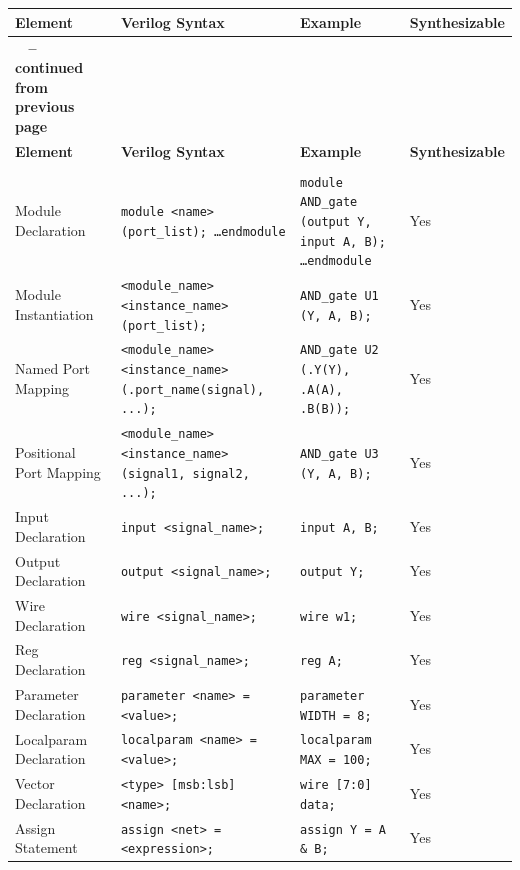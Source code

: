 \documentclass[12pt]{journal}
\begin{document}
\begin{longtable}{|>{\centering\arraybackslash}m{4cm}|>{\centering\arraybackslash}m{6cm}|>{\centering\arraybackslash}m{4cm}|>{\centering\arraybackslash}m{2cm}|}
\hline
\textbf{Element} & \textbf{Verilog Syntax} & \textbf{Example} & \textbf{Synthesizable} \\ 
\hline
\endfirsthead
\multicolumn{4}{c}%
{{\bfseries \tablename\ \thetable{} -- continued from previous page}} \\
\hline
\textbf{Element} & \textbf{Verilog Syntax} & \textbf{Example} & \textbf{Synthesizable} \\ 
\hline
\endhead
\hline \multicolumn{4}{|c|}{{\textbf{Continued on next page}}} \\ \hline
\endfoot
\hline
\endlastfoot

Module Declaration & \texttt{module <name> (port\_list); \dots endmodule} & \texttt{module AND\_gate (output Y, input A, B); \dots endmodule} & Yes \\
\hline
Module Instantiation & \texttt{<module\_name> <instance\_name> (port\_list);} & \texttt{AND\_gate U1 (Y, A, B);} & Yes \\
\hline
Named Port Mapping & \texttt{<module\_name> <instance\_name> (.port\_name(signal), ...);} & \texttt{AND\_gate U2 (.Y(Y), .A(A), .B(B));} & Yes \\
\hline
Positional Port Mapping & \texttt{<module\_name> <instance\_name> (signal1, signal2, ...);} & \texttt{AND\_gate U3 (Y, A, B);} & Yes \\
\hline
Input Declaration & \texttt{input <signal\_name>;} & \texttt{input A, B;} & Yes \\
\hline
Output Declaration & \texttt{output <signal\_name>;} & \texttt{output Y;} & Yes \\
\hline
Wire Declaration & \texttt{wire <signal\_name>;} & \texttt{wire w1;} & Yes \\
\hline
Reg Declaration & \texttt{reg <signal\_name>;} & \texttt{reg A;} & Yes \\
\hline
Parameter Declaration & \texttt{parameter <name> = <value>;} & \texttt{parameter WIDTH = 8;} & Yes \\
\hline
Localparam Declaration & \texttt{localparam <name> = <value>;} & \texttt{localparam MAX = 100;} & Yes \\
\hline
Vector Declaration & \texttt{<type> [msb:lsb] <name>;} & \texttt{wire [7:0] data;} & Yes \\
\hline
Assign Statement & \texttt{assign <net> = <expression>;} & \texttt{assign Y = A \& B;} & Yes \\

\end{longtable}
\end{document}
